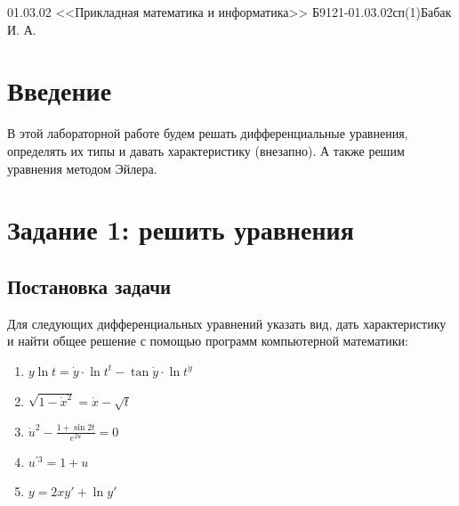 \documentclass[14pt, titlepage, a4paper, fleqn]{extarticle}
\begin{document}
     {01.03.02 <<Прикладная математика и информатика>>} {Б9121-01.03.02сп(1)}{Бабак И. А.}

    \tableofcontents

    \pagebreak

    \section{Введение}
        В этой лабораторной работе будем решать дифференциальные уравнения, определять их типы и давать характеристику (внезапно). А также решим уравнения методом Эйлера.

    \pagebreak

    \section{Задание 1: решить уравнения}
        \subsection{Постановка задачи}
            Для следующих дифференциальных уравнений указать вид, дать характеристику и найти общее решение с помощью программ компьютерной математики:

            \begin{enumerate}
                \item 
                \(y \ln{t}  = \dot{y} \cdot \ln{t^t} - \tan{\dot{y}} \cdot 
                \ln{t^{\dot{y}}}\)

                \item \(\sqrt{1 - \dot{x}^2} = \dot{x} - \sqrt{t}\)
                
                \item \(\displaystyle \dot{u}^2 - \frac{1 + \sin{2t}}{e^{2u}} = 0\)
                
                \item \(u^{\prime 3} = 1 + u\)
                
                \item \(y = 2xy' + \ln{y'}\)
            \end{enumerate}
\end{document}
